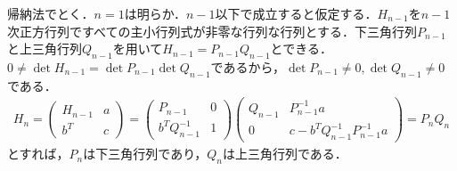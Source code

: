 \documentclass[
		book,
		head_space=20mm,
		foot_space=20mm,
		gutter=10mm,
		line_length=190mm
]{jlreq}
\begin{document}
帰納法でとく．$n=1$は明らか．$n-1$以下で成立すると仮定する．$H_{n-1}$を$n-1$次正方行列ですべての主小行列式が非零な行列な行列とする．下三角行列$P_{n-1}$と上三角行列$Q_{n-1}$を用いて$H_{n-1}=P_{n-1}Q_{n-1}$とできる．
$0\neq \det H_{n-1}=\det P_{n-1} \det Q_{n-1}$であるから，$\det P_{n-1}\neq 0,\det Q_{n-1}\neq 0$である．
\begin{align}
	H_n=\begin{pmatrix} H_{n-1} & a \\ b^T & c \end{pmatrix}=\begin{pmatrix} P_{n-1} & 0 \\ b^T Q_{n-1}^{-1} & 1 \end{pmatrix}\begin{pmatrix} Q_{n-1} & P_{n-1}^{-1}a \\ 0 & c-b^T Q_{n-1}^{-1}P_{n-1}^{-1}a \end{pmatrix}=P_nQ_n
\end{align}
とすれば，$P_n$は下三角行列であり，$Q_n$は上三角行列である．
\end{document}
